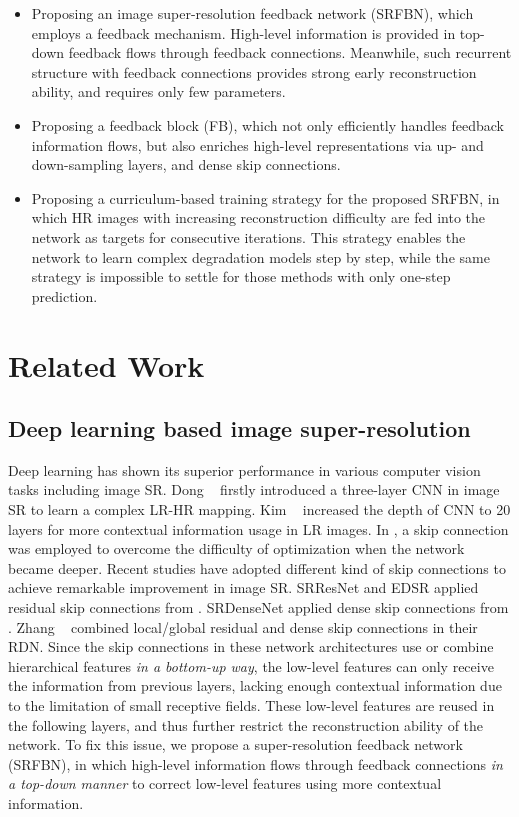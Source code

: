 \documentclass[10pt,twocolumn,letterpaper]{article}
\begin{document}
	\begin{itemize}
		\setlength{\itemsep}{0pt}
		\setlength{\parsep}{0pt}
		\setlength{\parskip}{0pt}
		\item Proposing an image super-resolution feedback network (SRFBN), which employs a feedback mechanism. High-level information is provided in top-down feedback flows through feedback connections. Meanwhile, such recurrent structure with feedback connections provides strong early reconstruction ability, and requires only few parameters.
		\item Proposing a feedback block (FB), which not only efficiently handles feedback information flows, but also enriches high-level representations via up- and down-sampling layers, and dense skip connections. 
		\item Proposing a curriculum-based training strategy for the proposed SRFBN, in which HR images with increasing reconstruction difficulty are fed into the network as targets for consecutive iterations. This strategy enables the network to learn complex degradation models step by step, while the same strategy is impossible to settle for those methods with only one-step prediction.
	\end{itemize}
	
	\section{Related Work}
	\subsection{Deep learning based image super-resolution}
	
	Deep learning has shown its superior performance in various computer vision tasks including image SR. Dong \etal~\cite{dong2016image} firstly introduced a three-layer CNN in image SR to learn a complex LR-HR mapping. Kim \etal~\cite{Kim_2016_CVPR} increased the depth of CNN to 20 layers for more contextual information usage in LR images. In \cite{Kim_2016_CVPR}, a skip connection was employed to overcome the difficulty of optimization when the network became deeper. Recent studies have adopted different kind of skip connections to achieve remarkable improvement in image SR. SRResNet\cite{DBLP:conf/cvpr/LedigTHCCAATTWS17} and EDSR\cite{lim2017enhanced} applied residual skip connections from \cite{He2016Deep}. SRDenseNet\cite{Tong_2017_ICCV} applied dense skip connections from \cite{Huang2016Densely}. Zhang \etal~\cite{Zhang_2018_CVPR} combined local/global residual and dense skip connections in their RDN. Since the skip connections in these network architectures use or combine hierarchical features \textit{in a bottom-up way}, the low-level features can only receive the information from previous layers, lacking enough contextual information due to the limitation of small receptive fields. These low-level features are reused in the following layers, and thus further restrict the reconstruction ability of the network. To fix this issue, we propose a super-resolution feedback network (SRFBN), in which high-level information flows through feedback connections \textit{in a top-down manner} to correct low-level features using more contextual information.
	
\end{document}
